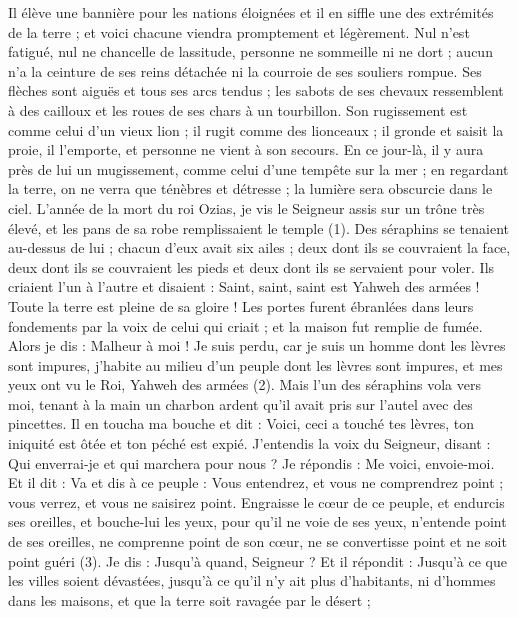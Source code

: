 \begin{multicols}{2}
Il élève une bannière pour les nations éloignées et il en siffle une des extrémités de la terre ; et voici chacune viendra promptement et légèrement.
Nul n’est fatigué, nul ne chancelle de lassitude, personne ne sommeille ni ne dort ; aucun n’a la ceinture de ses reins détachée ni la courroie de ses souliers rompue.
Ses flèches sont aiguës et tous ses arcs tendus ; les sabots de ses chevaux ressemblent à des cailloux et les roues de ses chars à un tourbillon.
Son rugissement est comme celui d’un vieux lion ; il rugit comme des lionceaux ; il gronde et saisit la proie, il l'emporte, et personne ne vient à son secours.
En ce jour-là, il y aura près de lui un mugissement, comme celui d’une tempête sur la mer ; en regardant la terre, on ne verra que ténèbres et détresse ; la lumière sera obscurcie dans le ciel.
\VerseOne{}L'année de la mort du roi Ozias, je vis le Seigneur assis sur un trône très élevé, et les pans de sa robe remplissaient le temple (1).
Des séraphins se tenaient au-dessus de lui ; chacun d'eux avait six ailes ; deux dont ils se couvraient la face, deux dont ils se couvraient les pieds et deux dont ils se servaient pour voler.
Ils criaient l'un à l'autre et disaient : Saint, saint, saint est Yahweh des armées ! Toute la terre est pleine de sa gloire !
Les portes furent ébranlées dans leurs fondements par la voix de celui qui criait ; et la maison fut remplie de fumée.
Alors je dis : Malheur à moi ! Je suis perdu, car je suis un homme dont les lèvres sont impures, j’habite au milieu d’un peuple dont les lèvres sont impures, et mes yeux ont vu le Roi, Yahweh des armées (2).
Mais l'un des séraphins vola vers moi, tenant à la main un charbon ardent qu'il avait pris sur l'autel avec des pincettes.
Il en toucha ma bouche et dit : Voici, ceci a touché tes lèvres, ton iniquité est ôtée et ton péché est expié.
J’entendis la voix du Seigneur, disant : Qui enverrai-je et qui marchera pour nous ? Je répondis : Me voici, envoie-moi.
Et il dit : Va et dis à ce peuple : Vous entendrez, et vous ne comprendrez point ; vous verrez, et vous ne saisirez point.
Engraisse le cœur de ce peuple, et endurcis ses oreilles, et bouche-lui les yeux, pour qu’il ne voie de ses yeux, n’entende point de ses oreilles, ne comprenne point de son cœur, ne se convertisse point et ne soit point guéri (3).
Je dis : Jusqu’à quand, Seigneur ? Et il répondit : Jusqu’à ce que les villes soient dévastées, jusqu’à ce qu'il n'y ait plus d'habitants, ni d'hommes dans les maisons, et que la terre soit ravagée par le désert ;

\end{multicols}
